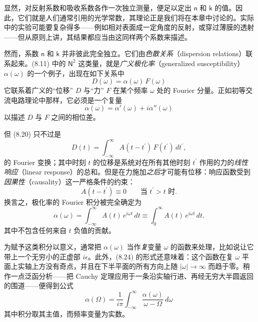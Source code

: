 显然，对反射系数和吸收系数各作一次独立测量，便足以定出 $\mathsf{n}$ 和 $\mathsf{k}$ 的值。因此，它们就是人们通常引用的光学常数，其理论正是我们将在本章中讨论的。实际中的实验可能要复杂得多——例如相对表面成一定角度的反射，或穿过薄膜的透射——但从原则上讲，其结果都应当由这同样两个系数来描述。

然而，系数 $\mathsf{n}$ 和 $\mathsf{k}$ 并非彼此完全独立。它们由\emph{色散关系}（dispersion relations）联系起来。(8.11) 中的 $\mathsf{N}^2$ 这类量，就是\emph{广义极化率}（generalized susceptibility）$\alpha(\omega)$ 的一个例子，出现在如下关系中
\begin{equation*}
D(\omega) = \alpha(\omega)\,F(\omega)\tag{8.20}
\end{equation*}
它联系着广义的“位移” $D$ 与“力” $F$ 在某个频率 $\omega$ 处的 Fourier 分量。正如初等交流电路理论中那样，它必须是一个复量
\begin{equation*}
\alpha(\omega) = \alpha'(\omega) + i\alpha''(\omega)\tag{8.21}
\end{equation*}
以描述 $D$ 与 $F$ 之间的相位差。

但 (8.20) 只不过是
\begin{equation*}
D(t) = \int_{-\infty}^{\infty} A(t-t^{\prime})\,F(t^{\prime})\,dt^{\prime},\tag{8.22}
\end{equation*}
的 Fourier 变换；其中时刻 $t$ 的位移是系统对在所有其他时刻 $t^{\prime}$ 作用的力的\emph{线性响应}（linear response）的总和。但是在力施加\emph{之后}才可能有位移：响应函数受到\emph{因果性}（causality）这一严格条件的约束：
\begin{equation*}
A(t-t^{\prime}) \equiv 0 \qquad \text{当 } t^{\prime} > t \text{ 时}.\tag{8.23}
\end{equation*}
换言之，极化率的 Fourier 积分被完全确定为
\begin{equation*}
\alpha(\omega) = \int_{-\infty}^{\infty} A(t)\,e^{i\omega t}\,dt \equiv \int_0^{\infty} A(t)\,e^{i\omega t}\,dt.\tag{8.24}
\end{equation*}
其中不包含任何来自 $t$ 负值的贡献。

为赋予这类积分以意义，通常把 $\alpha(\omega)$ 当作\emph{复}变量 $\omega$ 的函数来处理，比如说让它带上一个无穷小的正虚部 $i\epsilon$。此外，(8.24) 的形式还意味着：这个函数在复 $\omega$ 平面上实轴上方没有奇点，并且在下半平面的所有方向上随 $|\omega|\to\infty$ 而趋于零。稍作一点泛函分析——把 Cauchy 定理应用于一条沿实轴行进、再经无穷大半圆返回的围道——便得到公式
\begin{equation*}
\alpha(\Omega) = \frac{1}{i\pi}\int_{-\infty}^{\infty}\frac{\alpha(\omega)}{\omega-\Omega}\,d\omega\tag{8.25}
\end{equation*}
其中积分取其主值，而频率变量为实数。


